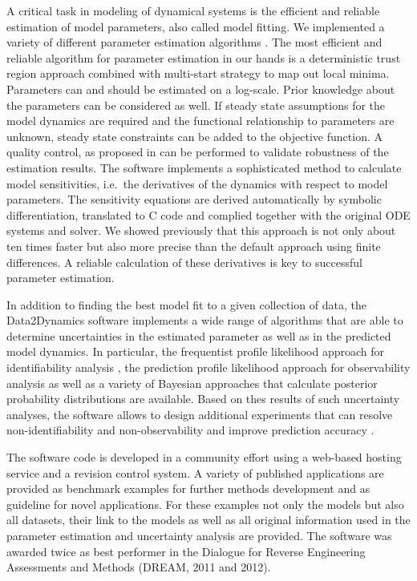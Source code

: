 \documentclass{bioinfo}
\begin{document}
A critical task in modeling of dynamical systems is the efficient and reliable estimation of 
model parameters, also called model fitting. We implemented a variety of different 
parameter estimation algorithms \citep{Raue:2012zt}. The most efficient and reliable 
algorithm for parameter estimation in our hands is a deterministic trust region approach 
combined with multi-start strategy to map out local minima. Parameters can and should 
be estimated on a log-scale. Prior knowledge about the parameters can be considered as 
well. If steady state assumptions for the model dynamics are required and the functional 
relationship to parameters are unknown, steady state constraints can be added to the 
objective function. A quality control, as proposed in 
\citet{Raue:2012zt} can be performed to validate robustness of the estimation results. The 
software implements a sophisticated method to calculate model sensitivities, i.e.~the 
derivatives of the dynamics with respect to model parameters. The sensitivity equations 
are derived automatically by symbolic differentiation, translated to C code and complied 
together with the original ODE systems and solver. We showed previously 
\citep{Raue:2012zt} that this approach is not only about ten times faster but also more 
precise than the default approach using finite differences. A reliable calculation of these 
derivatives is key to successful parameter estimation. 

In addition to finding the best model fit to a given collection of data, the Data2Dynamics 
software implements a wide range of algorithms that are able to determine uncertainties 
in the estimated parameter as well as in the predicted model dynamics. In particular, the 
frequentist profile likelihood approach for identifiability analysis \citep{Raue:2009ec}, the 
prediction profile likelihood approach for observability analysis \citep{Kreutz:2011kx} as 
well as a variety of Bayesian approaches \citep{Raue:2013fk, Hug:2012fk} that calculate 
posterior probability distributions are available. Based on thes results of such uncertainty 
analyses, the software allows to design additional experiments \citep{Steiert:2012fk} that 
can resolve non-identifiability and non-observability \citep{Raue:2010fk} 
and improve prediction accuracy \citep{Kreutz:2013uq}.

The software code is developed in a community effort using a web-based hosting service 
and a revision control system. A variety of published applications are provided as benchmark examples for further methods development and as guideline for novel applications. For these examples not only the models but also all datasets, their link to the models as well as all original information used in the parameter estimation and uncertainty analysis are provided. The software was awarded twice as best performer in the Dialogue for Reverse Engineering Assessments and Methods (DREAM, 2011 and 2012).
\end{document}
